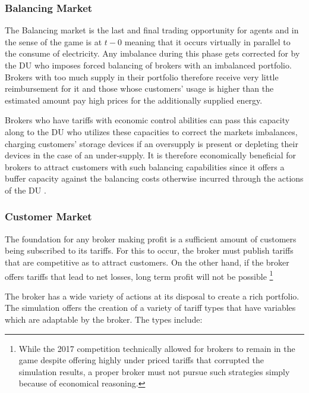 \subsubsection{Balancing Market} The Balancing market is the last and final trading opportunity for agents and in the
sense of the game is at $t-0$ meaning that it occurs virtually in parallel to the consume of electricity. Any imbalance
during this phase gets corrected for by the \ac{DU} who imposes forced balancing of brokers with an imbalanced
portfolio. Brokers with too much supply in their portfolio therefore receive very little reimbursement for it and those
whose customers' usage is higher than the estimated amount pay high prices for the additionally supplied energy.

Brokers who have tariffs with economic control abilities can pass this capacity along to the \ac{DU} who utilizes these
capacities to correct the markets imbalances, charging customers' storage devices if an oversupply is present or
depleting their devices in the case of an under-supply. It is therefore economically beneficial for brokers to attract
customers with such balancing capabilities since it offers a buffer capacity against the balancing costs otherwise
incurred through the actions of the \ac{DU} \citep[p.5]{ketter2018powertac} .





\subsubsection{Customer Market}

The foundation for any broker making profit is a sufficient amount of customers being subscribed to its tariffs. For
this to occur, the broker must publish tariffs that are competitive as to attract customers. On the other hand, if the
broker offers tariffs that lead to net losses, long term profit will not be possible
\footnote{While the 2017
    competition technically allowed for brokers to remain in the game despite offering highly under priced tariffs that
    corrupted the simulation results, a proper broker must not pursue such strategies simply because of economical
reasoning.}

The broker has a wide variety of actions at its disposal to create a rich portfolio. The simulation offers the
creation of a variety of tariff types that have variables which are adaptable by the broker. The types include:

